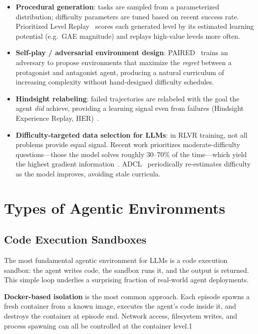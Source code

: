 \begin{itemize}
  \item \textbf{Procedural generation}: tasks are sampled from a parameterized distribution; difficulty parameters are tuned based on recent success rate. Prioritized Level Replay~\cite{jiang2021plr} scores each generated level by its estimated learning potential (e.g.~GAE magnitude) and replays high-value levels more often.
  \item \textbf{Self-play / adversarial environment design}: PAIRED~\cite{dennis2020paired} trains an adversary to propose environments that maximize the \emph{regret} between a protagonist and antagonist agent, producing a natural curriculum of increasing complexity without hand-designed difficulty schedules.
  \item \textbf{Hindsight relabeling}: failed trajectories are relabeled with the goal the agent \emph{did} achieve, providing a learning signal even from failures (Hindsight Experience Replay, HER)~\cite{andrychowicz2017hindsight}.
  \item \textbf{Difficulty-targeted data selection for LLMs}: in RLVR training, not all problems provide equal signal. Recent work prioritizes moderate-difficulty questions---those the model solves roughly 30--70\% of the time---which yield the highest gradient information~\cite{wang2025dataefficiency}. ADCL~\cite{liu2025adcl} periodically re-estimates difficulty as the model improves, avoiding stale curricula.
\end{itemize}

\section{Types of Agentic Environments}
\label{sec:env-types}

\subsection{Code Execution Sandboxes}
\label{code-execution-sandboxes}

The most fundamental agentic environment for LLMs is a code execution sandbox: the agent writes code, the sandbox runs it, and the output is returned. This simple loop underlies a surprising fraction of real-world agent deployments.

\textbf{Docker-based isolation} is the most common approach. Each episode spawns a fresh container from a known image, executes the agent’s code inside it, and destroys the container at episode end. Network access, filesystem writes, and process spawning can all be controlled at the container level.1

